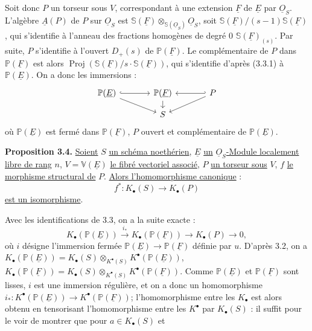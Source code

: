 
Soit donc $P$ un torseur sous $V$, correspondant à une extension $\underline{F}$ de $\underline{E}$ par $\underline{O}_S$. L'algèbre $\underline{A}(P)$ de $P$ sur $\underline{O}_S$ est $\mathbb S(\underline{F})\otimes_{\mathbb S(\underline{O}_S)}\underline{O}_S$, soit $\mathbb S(\underline{F})/(s-1)\mathbb S(\underline{F})$, qui s'identifie à l'anneau des fractions homogènes de degré $0$ $\mathbb S(\underline{F})_{(s)}$. Par suite, $P$ s'identifie à l'ouvert $D_+(s)$ de $\mathbb P(\underline{F})$. Le complémentaire de $P$ dans $\mathbb P(\underline{F})$ est alors $\operatorname{Proj}(\mathbb S(\underline{F})/s\cdot \mathbb S(\underline{F}))$, qui s'identifie d'après (3.3.1) à $\mathbb P(\underline{E})$. On a donc les immersions :
\[
\begin{tikzcd}[column sep=large,row sep=small]
\mathbb P(\underline{E}) \arrow[r,hook] \arrow[dr] & \mathbb P(\underline{F}) \arrow[d] & P \arrow[l,hook'] \arrow[dl]\\
& S &
\end{tikzcd}
\]
où $\mathbb P(\underline{E})$ est fermé dans $\mathbb P(\underline{F})$, $P$ ouvert et complémentaire de $\mathbb P(\underline{E})$.

\textbf{Proposition 3.4.} \uline{Soient} $S$ \uline{un schéma noethérien}, $\underline{E}$ \uline{un} $\underline{O}_S$\uline{-Module localement libre de rang} $n$, $V=\mathbb V(\underline{E})$ \uline{le fibré vectoriel associé}, $P$ \uline{un torseur sous} $V$, $f$ \uline{le morphisme structural de} $P$. \uline{Alors l'homomorphisme canonique} :
\[
f^*:K_\bullet(S)\longrightarrow K_\bullet(P)
\]
\uline{est un isomorphisme}.

Avec les identifications de 3.3, on a la suite exacte :
\[
K_\bullet(\mathbb P(\underline{E}))\xrightarrow{i_*}K_\bullet(\mathbb P(\underline{F}))\longrightarrow K_\bullet(P)\longrightarrow 0,
\tag{3.4.1}
\]
où $i$ désigne l'immersion fermée $\mathbb P(\underline{E})\to \mathbb P(\underline{F})$ définie par $u$. D'après 3.2, on a $K_\bullet(\mathbb P(\underline{E}))=K_\bullet(S)\otimes_{K^{\bullet}(S)}K^{\bullet}(\mathbb P(\underline{E}))$, $K_\bullet(\mathbb P(\underline{F}))=K_\bullet(S)\otimes_{K^{\bullet}(S)}K^{\bullet}(\mathbb P(\underline{F}))$.
Comme $\mathbb P(\underline{E})$ et $\mathbb P(\underline{F})$ sont lisses, $i$ est une immersion régulière, et on a donc un homomorphisme $i_*:K^{\bullet}(\mathbb P(\underline{E}))\to K^{\bullet}(\mathbb P(\underline{F}))$; l'homomorphisme entre les $K_\bullet$ est alors obtenu en tensorisant l'homomorphisme entre les $K^{\bullet}$ par $K_\bullet(S)$ : il suffit pour le voir de montrer que pour $a\in K_\bullet(S)$ et
